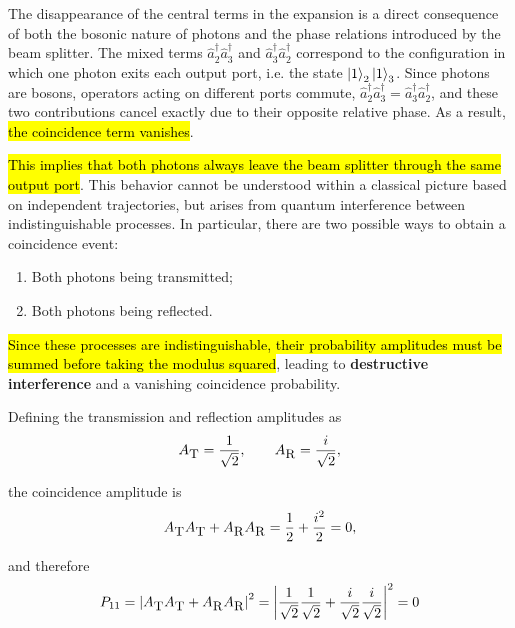 The disappearance of the central terms in the expansion is a direct consequence of both the bosonic nature of photons and the phase relations introduced by the beam splitter. The mixed terms $\hat a_2^\dagger \hat a_3^\dagger$ and $\hat a_3^\dagger \hat a_2^\dagger$ correspond to the configuration in which one photon exits each output port, i.e. the state $\ket{1}_2\ket{1}_3$. Since photons are bosons, operators acting on different ports commute, $\hat a_2^\dagger \hat a_3^\dagger = \hat a_3^\dagger \hat a_2^\dagger$, and these two contributions cancel exactly due to their opposite relative phase. As a result, \hl{the coincidence term vanishes}.

\hl{This implies that both photons always leave the beam splitter through the same output port}. This behavior cannot be understood within a classical picture based on independent trajectories, but arises from quantum interference between indistinguishable processes. 
In particular, there are two possible ways to obtain a coincidence event: 
\begin{enumerate}
\item Both photons being transmitted;
\item Both photons being reflected.
\end{enumerate}

\hl{Since these processes are indistinguishable, their probability amplitudes must be summed before taking the modulus squared}, leading to \textbf{destructive interference} and a vanishing coincidence probability.

Defining the transmission and reflection amplitudes as
\begin{equation}\label{eqn:16-b-s-amplitudes}
A_{\textsc{\small{T}}} = \frac{1}{\sqrt{2}}, \qquad A_{\textsc{\small{R}}} = \frac{i}{\sqrt{2}},
\end{equation}

the coincidence amplitude is
\begin{equation}\label{eqn:16-coincidence-amplitude}
A_{\textsc{\small{T}}} A_{\textsc{\small{T}}} + A_{\textsc{\small{R}}} A_{\textsc{\small{R}}} = \frac{1}{2} + \frac{i^2}{2} = 0,
\end{equation}

and therefore
\begin{equation}\label{eqn:16-coincidence-probability}
P_{11} = \left|A_{\textsc{\small{T}}} A_{\textsc{\small{T}}} + A_{\textsc{\small{R}}} A_{\textsc{\small{R}}}\right|^2 = \left|\frac{1}{\sqrt{2}}\frac{1}{\sqrt{2}}+\frac{i}{\sqrt{2}}\frac{i}{\sqrt{2}}\right|^2 = 0
\end{equation}


